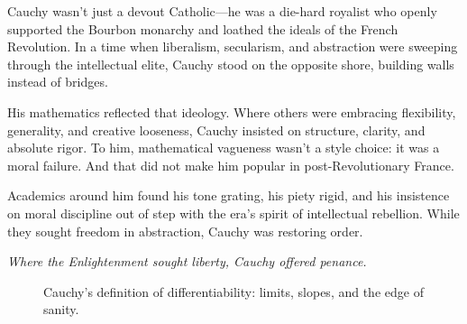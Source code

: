 \begin{tcolorbox}[
  colback=gray!5,
  colframe=black,
  title=\textbf{Historical Sidebar: Cauchy vs. the Revolution},
  fonttitle=\bfseries,
  width=\linewidth,
  enlarge left by=0mm,
  enlarge right by=0mm,
  boxrule=0.4pt,
  arc=2mm,
  left=4pt,
  right=4pt,
  top=6pt,
  bottom=6pt
]
Cauchy wasn’t just a devout Catholic—he was a die-hard royalist who openly supported the Bourbon monarchy and loathed the ideals of the French Revolution. In a time when liberalism, secularism, and abstraction were sweeping through the intellectual elite, Cauchy stood on the opposite shore, building walls instead of bridges.

\medskip

His mathematics reflected that ideology. Where others were embracing flexibility, generality, and creative looseness, Cauchy insisted on structure, clarity, and absolute rigor. To him, mathematical vagueness wasn’t a style choice: it was a moral failure. And that did not make him popular in post-Revolutionary France.

\medskip

Academics around him found his tone grating, his piety rigid, and his insistence on moral discipline out of step with the era’s spirit of intellectual rebellion. While they sought freedom in abstraction, Cauchy was restoring order.

\medskip

\begin{center}
\emph{Where the Enlightenment sought liberty, Cauchy offered penance.}
\end{center}
\end{tcolorbox}

\begin{figure}[H]
\centering
{}
\caption{Cauchy's definition of differentiability: limits, slopes, and the edge of sanity.}
\end{figure}


